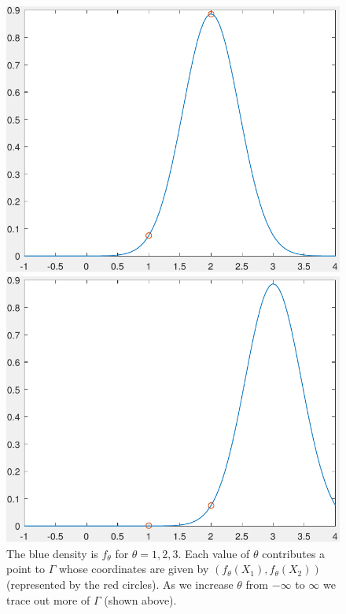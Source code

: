 \begin{figure}[ht]
\begin{minipage}[b]{0.3\linewidth}
			\end{minipage}
			\begin{minipage}[b]{0.3\linewidth}
				\includegraphics[width=\textwidth]{GammaTraceDensity02}
			\end{minipage}
			\begin{minipage}[b]{0.3\linewidth}
				\includegraphics[width=\textwidth]{GammaTraceDensity03}
			\end{minipage}
			\caption{The blue density is $f_\theta$ for $\theta = 1,2,3$. Each value of $\theta$ contributes a point to $\Gamma$ whose coordinates are given by $(f_\theta(X_1),f_\theta(X_2))$ (represented by the red circles). As we increase $\theta$ from $-\infty$ to $\infty$ we trace out more of $\Gamma$ (shown above).}\label{fig:TracingGamma}
		\end{figure}

